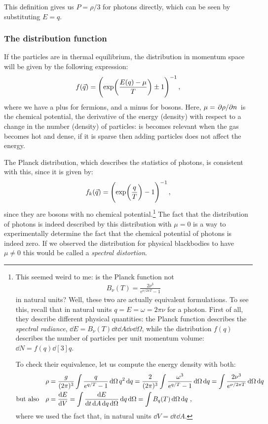 \documentclass[main.tex]{subfiles}
\begin{document}
This definition gives us \(P = \rho /3\) for photons directly, which can be seen by substituting \(E = q\). 

\subsubsection{The distribution function}

If the particles are in thermal equilibrium, the distribution in momentum space will be given by the following expression: 
%
\begin{equation}
  f(\vec{q}) = \qty(\exp(\frac{E(q)- \mu }{T}) \pm 1 )^{-1}
\,,
\end{equation}
%
where we have a plus for fermions, and a minus for bosons. Here, \(\mu = \pdv*{\rho }{n}\) is the chemical potential, the derivative of the energy (density) with respect to a change in the number (density) of particles: is becomes relevant when the gas becomes hot and dense, if it is sparse then adding particles does not affect the energy.


The Planck distribution, which describes the statistics of photons, is consistent with this, since it is given by: 
%
\begin{equation}
  f_k(\vec{q}) = \qty(\exp(\frac{q}{T}) -1 )^{-1}
\,,
\end{equation}
%
since they are bosons with no chemical potential.\footnote{This seemed weird to me: is the Planck function not 
%
\begin{align}
B_{\nu } (T) = \frac{2\nu^3}{e^{\nu / 2 \pi T} -1 }
\,
\end{align}
%
in natural units? Well, these two are actually equivalent formulations. To see this, recall that in natural units \(q = E = \omega = 2 \pi \nu \) for a photon. First of all, they describe different physical quantities: the Planck function describes the \emph{spectral radiance}, \(\dd{E} = B_\nu (T) \dd{t} \dd{A} \dd{\nu } \dd{\Omega }\), while the distribution \(f(q)\) describes the number of particles per unit momentum volume: \(\dd{N} = f(q) \dd[3]{q}\). 

To check their equivalence, let us compute the energy density with both: 
%
\begin{align}
\rho &=  \frac{g}{(2\pi )^3} \int \frac{q}{e^{q/T}-1} \dd{\Omega } q^2 \dd{q} = \frac{2}{(2\pi )^3}\int \frac{ \omega^3}{e^{q/T}-1} \dd{\Omega } \dd{q}  
= \int \frac{2 \nu^3}{e^{\nu /2 \pi T}} \dd{\Omega } \dd{q}
\\
\text{but also}\quad\rho &= \dv{E}{V} = \int \frac{ \dd{E}}{ \dd{t} \dd{A} \dd{q} \dd{\Omega }} \dd{q} \dd{\Omega } = \int B_q(T) \dd{\Omega } \dd{q}
\,,
\end{align}
%
where we used the fact that, in natural units \(\dd{V} = \dd{t} \dd{A}\).
}
The fact that the distribution of photons is indeed described by this distribution with \(\mu =0\) is a way to experimentally determine the fact that the chemical potential of photons is indeed zero. If we observed the distribution for physical blackbodies to have \(\mu \neq 0\) this would be called a \emph{spectral distortion}.
\end{document}
